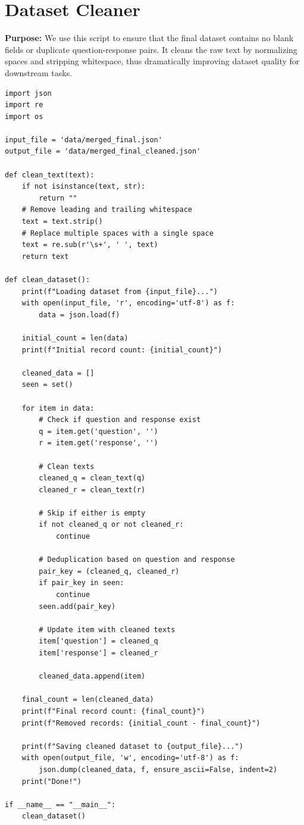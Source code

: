 \documentclass[11pt]{article}
\begin{document}
\clearpage

\section{Dataset Cleaner} \label{sec:cleaner}
\textbf{Purpose:} We use this script to ensure that the final dataset contains no blank fields or duplicate question-response pairs. It cleans the raw text by normalizing spaces and stripping whitespace, thus dramatically improving dataset quality for downstream tasks.

\begin{lstlisting}[style=pythoncode, caption={dataset\_cleaner.py}]
import json
import re
import os

input_file = 'data/merged_final.json'
output_file = 'data/merged_final_cleaned.json'

def clean_text(text):
    if not isinstance(text, str):
        return ""
    # Remove leading and trailing whitespace
    text = text.strip()
    # Replace multiple spaces with a single space
    text = re.sub(r'\s+', ' ', text)
    return text

def clean_dataset():
    print(f"Loading dataset from {input_file}...")
    with open(input_file, 'r', encoding='utf-8') as f:
        data = json.load(f)
    
    initial_count = len(data)
    print(f"Initial record count: {initial_count}")
    
    cleaned_data = []
    seen = set()
    
    for item in data:
        # Check if question and response exist
        q = item.get('question', '')
        r = item.get('response', '')
        
        # Clean texts
        cleaned_q = clean_text(q)
        cleaned_r = clean_text(r)
        
        # Skip if either is empty
        if not cleaned_q or not cleaned_r:
            continue
            
        # Deduplication based on question and response
        pair_key = (cleaned_q, cleaned_r)
        if pair_key in seen:
            continue
        seen.add(pair_key)
        
        # Update item with cleaned texts
        item['question'] = cleaned_q
        item['response'] = cleaned_r
        
        cleaned_data.append(item)
        
    final_count = len(cleaned_data)
    print(f"Final record count: {final_count}")
    print(f"Removed records: {initial_count - final_count}")
    
    print(f"Saving cleaned dataset to {output_file}...")
    with open(output_file, 'w', encoding='utf-8') as f:
        json.dump(cleaned_data, f, ensure_ascii=False, indent=2)
    print("Done!")

if __name__ == "__main__":
    clean_dataset()
\end{lstlisting}
\end{document}
